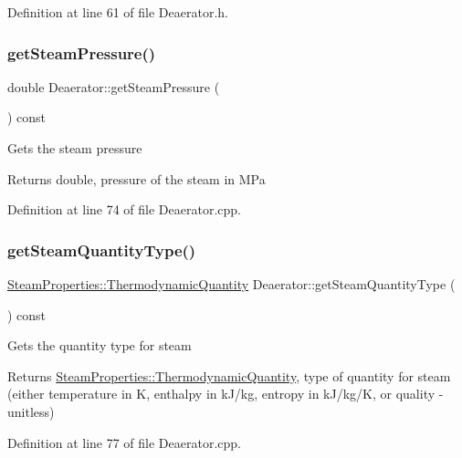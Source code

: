Definition at line 61 of file Deaerator.\+h.

\mbox{\label{class_deaerator_aebe779c63cace193d040f497e3b70728}} 
\subsubsection{\texorpdfstring{get\+Steam\+Pressure()}{getSteamPressure()}}
{\footnotesize\ttfamily double Deaerator\+::get\+Steam\+Pressure (\begin{DoxyParamCaption}{ }\end{DoxyParamCaption}) const}

Gets the steam pressure \begin{DoxyReturn}{Returns}
double, pressure of the steam in M\+Pa 
\end{DoxyReturn}


Definition at line 74 of file Deaerator.\+cpp.

\mbox{\label{class_deaerator_a18abbdc5ec78f71e1d2495b0c64c77ec}} 
\subsubsection{\texorpdfstring{get\+Steam\+Quantity\+Type()}{getSteamQuantityType()}}
{\footnotesize\ttfamily \hyperlink{class_steam_properties_ae0294bedf7d178c2d8fb6aed0f62fbff}{Steam\+Properties\+::\+Thermodynamic\+Quantity} Deaerator\+::get\+Steam\+Quantity\+Type (\begin{DoxyParamCaption}{ }\end{DoxyParamCaption}) const}

Gets the quantity type for steam \begin{DoxyReturn}{Returns}
\hyperlink{class_steam_properties_ae0294bedf7d178c2d8fb6aed0f62fbff}{Steam\+Properties\+::\+Thermodynamic\+Quantity}, type of quantity for steam (either temperature in K, enthalpy in k\+J/kg, entropy in k\+J/kg/K, or quality -\/ unitless) 
\end{DoxyReturn}


Definition at line 77 of file Deaerator.\+cpp.

\mbox{\label{class_deaerator_a5473feedca64e7c44143d422ed3e2401}} 
